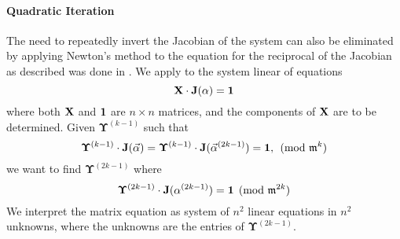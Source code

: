 {\paragraph{Quadratic Iteration}

The need to repeatedly invert the Jacobian of the system can also be 
eliminated by applying Newton's method to the equation for the reciprocal 
of the Jacobian as described was done in
.
We apply  to the system linear of equations
\[
\mathbf{X} \cdot \mathbf{J}(\alpha) = {\bf 1}
\]
where both $\bf X$ and $\bf 1$ are $n\times n$ matrices, and the
components of $\bf X$ are to be determined.  Given
$\mathbf{\Upsilon}^{(k-1)}$ such that 
\[
\mathbf{\Upsilon}^{(k-1)} \cdot \mathbf{J}(\vec{\alpha}) = 
\mathbf{\Upsilon}^{(k-1)} \cdot \mathbf{J}(\vec{\alpha}^{(2k-1)}) = {\bf 1},
  \pmod{\mathfrak{m}^{k}}
\]
we want to find $\mathbf{\Upsilon}^{(2k-1)}$ where
\begin{equation} \label{Jacobian:1:Eq}
\mathbf{\Upsilon}^{(2k-1)} \cdot \mathbf{J}(\alpha^{(2k-1)}) = {\bf 1} \pmod{\mathfrak{m}^{2k}}
\end{equation}
We interpret the matrix equation  as system of 
$n^{2}$ linear equations in $n^{2}$ unknowns, where the unknowns are the 
entries of $\mathbf{\Upsilon}^{(2k-1)}$. 

}
